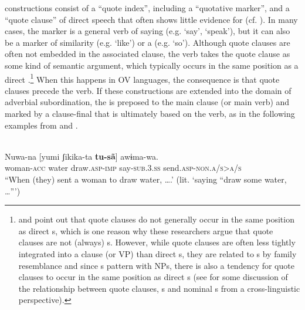 \documentclass[output=paper]{langsci/langscibook}
\begin{document}
 constructions consist of a “quote index”, including a “quotative marker”, and a “quote clause” of direct speech that often shows little evidence for  (cf. \citealt{Güldemann2008}). In many cases, the  marker is a general verb of saying (e.g. ‘say’, ‘speak’), but it can also be a marker of similarity (e.g. ‘like’) or a   (e.g. ‘so’). Although quote clauses are often not embedded in the associated clause, the  verb takes the quote clause as some kind of semantic argument, which typically occurs in the same position as a direct .\footnote{\citet{Munro1982} and \citet{Güldemann2008} point out that quote clauses do not generally occur in the same position as direct s, which is one reason why these researchers argue that quote clauses are not (always) s. However, while quote clauses are often less tightly integrated into a clause (or VP) than direct s, they are related to  s by family resemblance and since  s pattern with  NPs, there is also a tendency for quote clauses to occur in the same position as direct s (see \citealt{Schmidtke-BodeDiessel2017} for some discussion of the relationship between quote clauses,  s and nominal s from a cross-linguistic perspective).} When this happens in OV languages, the consequence is that quote clauses precede the  verb. If these constructions are extended into the domain of adverbial subordination, the  is preposed to the main clause (or main verb) and marked by a clause-final  that is ultimately based on the  verb, as in the following examples from   and  .

\ea\label{ex:diessel:15}
\\
\gll   Nuwa-na  [yumi  ʃikika-ta  \textbf{tu-sã}]  awɨma-wa.\\
       woman-\textsc{acc}  water  draw.\textsc{asp-imp}  say-\textsc{sub.3.ss}  send.\textsc{asp-non.a/s>a/s}\\
\glt “When (they) sent a woman to draw water, ….' (lit. ‘saying “draw some water, …”’) 
\z
\end{document}
